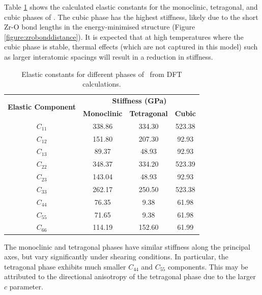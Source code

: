 Table \ref{stiffness_tensor} shows the calculated elastic constants for the monoclinic, tetragonal, and cubic phases of \zirconia . The cubic phase has the highest stiffness, likely due to the short Zr-O bond lengths in the energy-minimised structure (Figure \ref{figure:zrobonddistance}). It is expected that at high temperatures where the cubic phase is stable, thermal effects (which are not captured in this model) such as larger interatomic spacings will result in a reduction in stiffness.

\begin{table}[ht] %
\onehalfspacing
\centering
\caption{Elastic constants for different phases of \zirconia\ from DFT calculations.}
\label{stiffness_tensor}
\begin{tabular}{cccc}
\hline
\multirow{2}{*}{\textbf{Elastic Component}} & \multicolumn{3}{c}{\textbf{Stiffness (GPa)}}               \\ \cline{2-4} 
                                            & \textbf{Monoclinic} & \textbf{Tetragonal} & \textbf{Cubic} \\ \hline
$C_{11}$                                         & 338.86        & 334.30               & 523.38    \\
$C_{12}$                                         & 151.80        & 207.30               & 92.93     \\
$C_{13}$                                         & 89.37         & 48.93               & 92.93     \\
$C_{22}$                                         & 348.37        & 334.20               & 523.39    \\
$C_{23}$                                         & 143.04        & 48.93               & 92.93    \\
$C_{33}$                                         & 262.17        & 250.50               & 523.38   \\
$C_{44}$                                         & 76.35         & 9.38                & 61.98    \\
$C_{55}$                                         & 71.65         & 9.38                & 61.98   \\
$C_{66}$                                         & 114.19        & 152.60               & 61.99     \\ \hline
\end{tabular}
\end{table}

The monoclinic and tetragonal phases have similar stiffness along the principal axes, but vary significantly under shearing conditions. In particular, the tetragonal phase exhibits much smaller $C_{44}$ and $C_{55}$ components. This may be attributed to the directional anisotropy of the tetragonal phase due to the larger $c$ parameter. 

